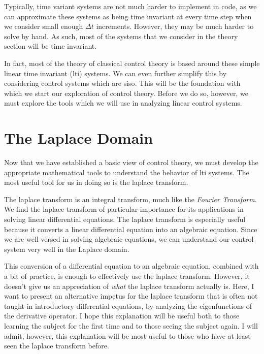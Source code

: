 Typically, time variant systems are not much harder to implement in code, as we can approximate these systems as being time invariant at every time step when we consider small enough $\Delta t$ increments. However, they may be much harder to solve by hand. As such, most of the systems that we consider in the theory section will be time invariant.

In fact, most of the theory of classical control theory is based around these simple linear time invariant (\gls{lti}) systems. We can even further simplify this by considering control systems which are \gls{siso}. This will be the foundation with which we start our exploration of control theory. Before we do so, however, we must explore the tools which we will use in analyzing linear control systems.

\chapter{The Laplace Domain}\label{chap:laplace domain}

Now that we have established a basic view of control theory, we must develop the appropriate mathematical tools to understand the behavior of \gls{lti} systems. The most useful tool for us in doing so is the \gls{laplace transform}.

The \gls{laplace transform} is an integral transform, much like the \textit{Fourier Transform}. We find the \gls{laplace transform} of particular importance for its applications in solving linear differential equations. The \gls{laplace transform} is especially useful because it converts a linear differential equation into an algebraic equation. Since we are well versed in solving algebraic equations, we can understand our control system very well in the Laplace domain.

This conversion of a differential equation to an algebraic equation, combined with a bit of practice, is enough to effectively use the \gls{laplace transform}. However, it doesn't give us an appreciation of \textit{what} the \gls{laplace transform} actually is. Here, I want to present an alternative impetus for the \gls{laplace transform} that is often not taught in introductory differential equations, by analyzing the \glspl{eigenfunction} of the derivative operator. I hope this explanation will be useful both to those learning the subject for the first time and to those seeing the subject again. I will admit, however, this explanation will be most useful to those who have at least seen the \gls{laplace transform} before.

